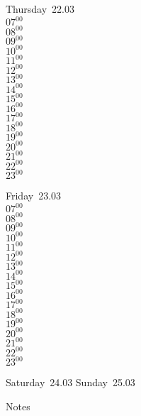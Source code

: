 \documentclass[11pt, a4paper]{book}\usepackage[]{graphicx}\usepackage[]{color}
\begin{document}
\begin{weekdaybox}
  Thursday~22.03\\
  { 
  \vfill
  $07^{00}$\\
$08^{00}$\\
$09^{00}$\\
$10^{00}$\\
$11^{00}$\\
$12^{00}$\\
$13^{00}$\\
$14^{00}$\\
$15^{00}$\\
$16^{00}$\\
$17^{00}$\\
$18^{00}$\\
$19^{00}$\\
$20^{00}$\\
$21^{00}$\\
$22^{00}$\\
$23^{00}$\\
  }
\end{weekdaybox} 
\begin{weekdaybox}
  Friday~23.03\\
  { 
  \vfill
  $07^{00}$\\
$08^{00}$\\
$09^{00}$\\
$10^{00}$\\
$11^{00}$\\
$12^{00}$\\
$13^{00}$\\
$14^{00}$\\
$15^{00}$\\
$16^{00}$\\
$17^{00}$\\
$18^{00}$\\
$19^{00}$\\
$20^{00}$\\
$21^{00}$\\
$22^{00}$\\
$23^{00}$\\
  }
\end{weekdaybox}
\begin{weekendbox}
  Saturday~24.03
  \tcblower
  Sunday~25.03
\end{weekendbox} %
\begin{notebox}
  Notes
\end{notebox}
\clearpage
\end{document}
